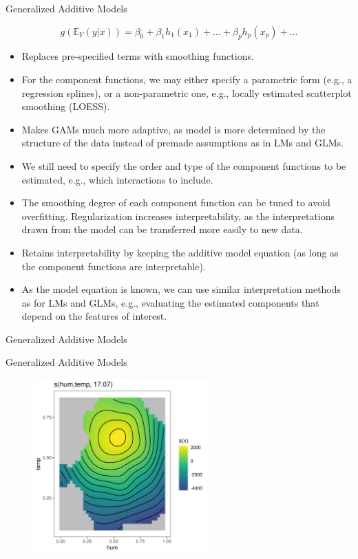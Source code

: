 \documentclass[11pt,compress,t,notes=noshow, aspectratio=169, xcolor=table]{beamer}
\begin{document}
\begin{vbframe}{Generalized Additive Models}

$$
g\left(\mathbb{E}_Y(y \vert x)\right) = \beta_0 + \beta_1 h_1(x_1) + \dots + \beta_p h_p(x_p) + \dots
$$
\begin{itemize}
\setlength\itemsep{2em}
\item Replaces pre-specified terms with smoothing functions.
\item For the component functions, we may either specify a parametric form (e.g., a regression splines), or a non-parametric one, e.g., locally estimated scatterplot smoothing (LOESS).
\item Makes GAMs much more adaptive, as model is more determined by the structure of the data instead of premade assumptions as in LMs and GLMs.
\item We still need to specify the order and type of the component functions to be estimated, e.g., which interactions to include.
\item The smoothing degree of each component function can be tuned to avoid overfitting. Regularization increases interpretability, as the interpretations drawn from the model can be transferred more easily to new data.
\item Retains interpretability by keeping the additive model equation (as long as the component functions are interpretable). 
\item
As the model equation is known, we can use similar interpretation methods as for LMs and GLMs, e.g., evaluating the estimated components that depend on the features of interest.
\end{itemize}
\end{vbframe}


\begin{vbframe}{Generalized Additive Models}
\tiny

\end{vbframe}


\begin{vbframe}{Generalized Additive Models}
\begin{figure}
  \includegraphics[width = 0.6\textwidth]{figure/gam_effect_plot.png}
\end{figure}
\end{vbframe}
\end{document}
